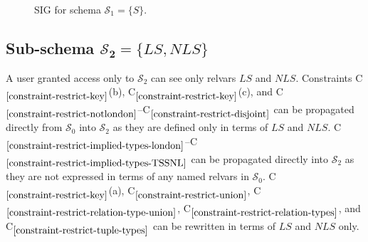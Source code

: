 \documentclass{article}
\newcounter{constraint}
\newcommand{\identifier}[1]{\ensuremath{\mathit{#1}}}
\newcommand{\LS}{\identifier{LS}}
\newcommand{\NLS}{\identifier{NLS}}
\newcommand{\schema}[1]{\ensuremath{\mathcal{S}_{#1}}}
\newcommand{\Constraint}[2][]{C\ensuremath{_{#2}\ifx&#1&\else^{#1}\fi}}
\begin{document}
\begin{figure}
    \caption{SIG for schema \(\schema{1} = \{S\}\).}
    \label{fig-sig-s-i-restrict}
\end{figure}





\subsection{Sub-schema \(\bm{\schema{2} = \{\LS, \NLS\}}\)}

\noindent A user granted access only to \(\schema{2}\) can see only relvars \(\LS\) and \(\NLS\). Constraints \Constraint{\ref{constraint-restrict-key}}(b),  \Constraint{\ref{constraint-restrict-key}}(c), and \Constraint{\ref{constraint-restrict-notlondon}}--\Constraint{\ref{constraint-restrict-disjoint}} can be propagated directly from \(\schema{0}\) into \(\schema{2}\) as they are defined only in terms of \(\LS\) and \(\NLS\). \Constraint{\ref{constraint-restrict-implied-types-london}}--\Constraint{\ref{constraint-restrict-implied-types-TSSNL}} can be propagated directly into \(\schema{2}\) as they are not expressed in terms of any named relvars in \(\schema{0}\). \Constraint{\ref{constraint-restrict-key}}(a), \Constraint{\ref{constraint-restrict-union}}, \Constraint{\ref{constraint-restrict-relation-type-union}}, \Constraint{\ref{constraint-restrict-relation-types}}, and \Constraint{\ref{constraint-restrict-tuple-types}} can be rewritten in terms of \(\LS\) and \(\NLS\) only.
\end{document}
